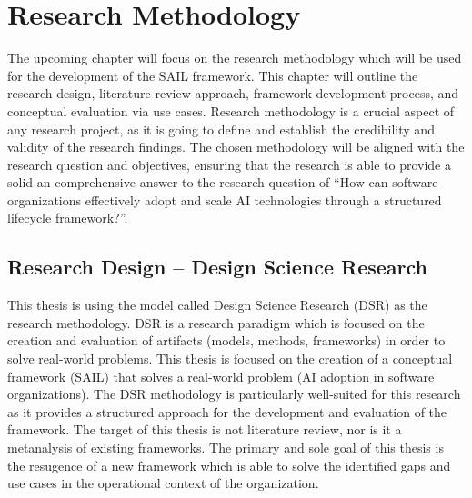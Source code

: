 \documentclass[]{imc-inf}
\begin{document}
\chapter{Research Methodology}\label{research-methodology}

The upcoming chapter will focus on the research methodology which will
be used for the development of the SAIL framework. This chapter will
outline the research design, literature review approach, framework
development process, and conceptual evaluation via use cases. Research
methodology is a crucial aspect of any research project, as it is going
to define and establish the credibility and validity of the research
findings. The chosen methodology will be aligned with the research
question and objectives, ensuring that the research is able to provide a
solid an comprehensive answer to the research question of ``How can
software organizations effectively adopt and scale AI technologies
through a structured lifecycle framework?''.

\section{Research Design -- Design Science
	Research}\label{research-design-design-science-research}

This thesis is using the model called Design Science Research (DSR) as
the research methodology. DSR is a research paradigm which is focused on
the creation and evaluation of artifacts (models, methods, frameworks)
in order to solve real-world problems. This thesis is focused on the
creation of a conceptual framework (SAIL) that solves a real-world
problem (AI adoption in software organizations). The DSR methodology is
particularly well-suited for this research as it provides a structured
approach for the development and evaluation of the framework. The target
of this thesis is not literature review, nor is it a metanalysis of
existing frameworks. The primary and sole goal of this thesis is the
resugence of a new framework which is able to solve the identified gaps
and use cases in the operational context of the organization.
\end{document}
